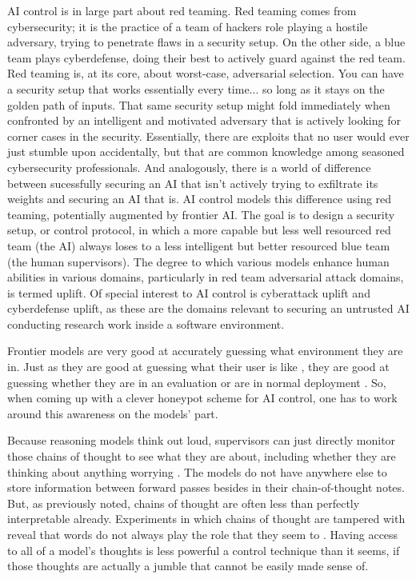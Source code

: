 AI control is in large part about red teaming. Red teaming comes from
cybersecurity; it is the practice of a team of hackers role playing a hostile
adversary, trying to penetrate flaws in a security setup. On the other side, a
blue team plays cyberdefense, doing their best to actively guard against the
red team. Red teaming is, at its core, about worst-case, adversarial selection.
You can have a security setup that works essentially every time... so long as
it stays on the golden path of inputs. That same security setup might fold
immediately when confronted by an intelligent and motivated adversary that is
actively looking for corner cases in the security. Essentially, there are
exploits that no user would ever just stumble upon accidentally, but that are
common knowledge among seasoned cybersecurity professionals. And analogously,
there is a world of difference between sucessfully securing an AI that isn't
actively trying to exfiltrate its weights and securing an AI that is. AI
control models this difference using red teaming, potentially augmented by
frontier AI. The goal is to design a security setup, or control protocol, in
which a more capable but less well resourced red team (the AI) always loses to
a less intelligent but better resourced blue team (the human supervisors). The
degree to which various models enhance human abilities in various domains,
particularly in red team adversarial attack domains, is termed uplift. Of
special interest to AI control is cyberattack uplift and cyberdefense uplift,
as these are the domains relevant to securing an untrusted AI conducting
research work inside a software environment.

Frontier models are very good at accurately guessing what environment they are
in. Just as they are good at guessing what their user is like
\cite{derner2024truesight}, they are good at guessing whether they are in an
evaluation or are in normal deployment \cite{needham2025know}. So, when coming
up with a clever honeypot scheme for AI control, one has to work around this
awareness on the models' part.

Because reasoning models think out loud, supervisors can just directly monitor
those chains of thought to see what they are about, including whether they are
thinking about anything worrying \cite{baker2025monitoring}. The models do not
have anywhere else to store information between forward passes besides in their
chain-of-thought notes. But, as previously noted, chains of thought are often
less than perfectly interpretable already. Experiments in which chains of
thought are tampered with reveal that words do not always play the role that
they seem to \cite{}. Having access to all of a model's thoughts is less
powerful a control technique than it seems, if those thoughts are actually a
jumble that cannot be easily made sense of.

